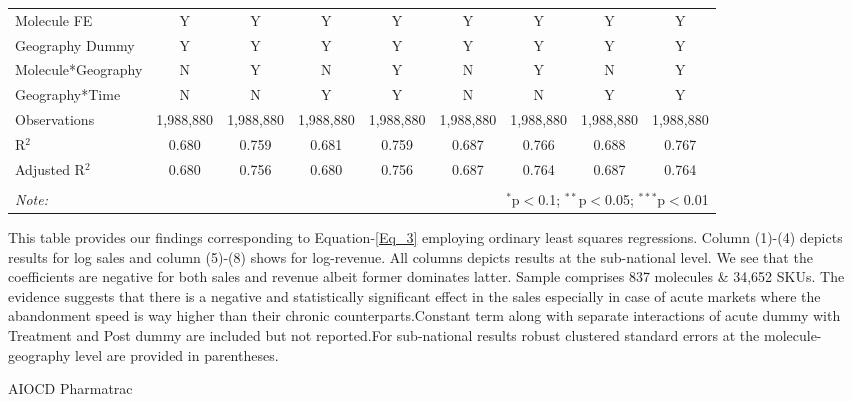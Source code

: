 \documentclass[AER]{AEA}
\theoremstyle{theorem}
\begin{document}
\begin{table}[h!]
\begin{tabular}{@{\extracolsep{2pt}}lcccccccc}
	Molecule FE & Y & Y & Y & Y & Y & Y & Y & Y \\ 
	Geography Dummy & Y & Y & Y & Y & Y & Y & Y & Y \\ 
	Molecule*Geography & N & Y & N & Y & N & Y & N & Y \\ 
	Geography*Time & N & N & Y & Y & N & N & Y & Y \\ 
	Observations & 1,988,880 & 1,988,880 & 1,988,880 & 1,988,880 & 1,988,880 & 1,988,880 & 1,988,880 & 1,988,880 \\ 
	R$^{2}$ & 0.680 & 0.759 & 0.681 & 0.759 & 0.687 & 0.766 & 0.688 & 0.767 \\ 
	Adjusted R$^{2}$ & 0.680 & 0.756 & 0.680 & 0.756 & 0.687 & 0.764 & 0.687 & 0.764 \\ 
	\hline 
	\hline \\[-1.8ex] 
	\textit{Note:}  & \multicolumn{8}{r}{$^{*}$p$<$0.1; $^{**}$p$<$0.05; $^{***}$p$<$0.01} \\ 
\end{tabular} 
	\begin{tablenotes}
		This table provides our findings corresponding to Equation-\ref{Eq_3}  employing ordinary least squares regressions. Column (1)-(4) depicts results for log sales and column (5)-(8) shows for log-revenue. All columns  depicts results at the sub-national level. We see that the coefficients are negative for both sales and revenue albeit former dominates latter. Sample comprises 837 molecules \& 34,652 SKUs. The evidence suggests that there is a negative and statistically significant effect in the sales especially in case of acute markets where the abandonment speed is way higher than their chronic counterparts.Constant term along with separate interactions of acute dummy with Treatment and Post dummy are included but not reported.For sub-national results  robust clustered standard errors at the molecule-geography level are provided in parentheses.
	\end{tablenotes}
	\begin{tablenotes}[Source]
		AIOCD Pharmatrac
	\end{tablenotes}
\end{table} 
\end{document}
